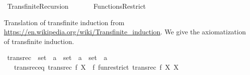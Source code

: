 %
\begin{isabellebody}%
%
%
\isadelimdocument
%
\endisadelimdocument
%
\isatagdocument
\isanewline
%
\isamarkuptrue%
%
\endisatagdocument
{\isafolddocument}%
%
\isadelimdocument
%
\endisadelimdocument
%
\isadelimtheory
%
\endisadelimtheory
%
\isatagtheory
{}\isamarkupfalse%
\ Transfinite{\isacharunderscore}{\kern0pt}Recursion\isanewline
\ \ \isanewline
\ \ \ \ Functions{\isacharunderscore}{\kern0pt}Restrict\isanewline
{}%
\endisatagtheory
{\isafoldtheory}%
%
\isadelimtheory
%
\endisadelimtheory
%
\isadelimdocument
%
\endisadelimdocument
%
\isatagdocument
%
\isamarkuptrue%
%
\endisatagdocument
{\isafolddocument}%
%
\isadelimdocument
%
\endisadelimdocument
%
\begin{isamarkuptext}%
Translation of transfinite induction from \url{https://en.wikipedia.org/wiki/Transfinite_induction}.
We give the axiomatization of transfinite induction.%
\end{isamarkuptext}\isamarkuptrue%
\isamarkupfalse%
\ transrec\ {\isacharcolon}{\kern0pt}{\isacharcolon}{\kern0pt}\ {\isachardoublequoteopen}{\isacharparenleft}{\kern0pt}{\isacharparenleft}{\kern0pt}set\ {\isasymRightarrow}\ {\isacharprime}{\kern0pt}a{\isacharparenright}{\kern0pt}\ {\isasymRightarrow}\ set\ {\isasymRightarrow}\ {\isacharprime}{\kern0pt}a{\isacharparenright}{\kern0pt}\ {\isasymRightarrow}\ set\ {\isasymRightarrow}\ {\isacharprime}{\kern0pt}a{\isachardoublequoteclose}\isanewline
\ \ \ transrec{\isacharunderscore}{\kern0pt}eq{\isacharcolon}{\kern0pt}\ {\isachardoublequoteopen}transrec\ f\ X\ {\isacharequal}{\kern0pt}\ f\ {\isacharparenleft}{\kern0pt}fun{\isacharunderscore}{\kern0pt}restrict\ {\isacharparenleft}{\kern0pt}transrec\ f{\isacharparenright}{\kern0pt}\ X{\isacharparenright}{\kern0pt}\ X{\isachardoublequoteclose}\isanewline
%
\isadelimtheory
\isanewline
%
\endisadelimtheory
%
\isatagtheory
{}\isamarkupfalse%
%
\endisatagtheory
{\isafoldtheory}%
%
\isadelimtheory
%
\endisadelimtheory
%
\end{isabellebody}%
\endinput
